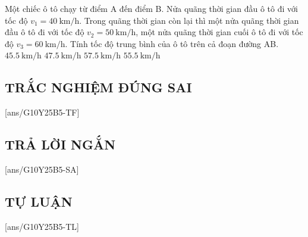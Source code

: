 \begin{ex}
	Một chiếc ô tô chạy từ điểm A đến điểm B. Nửa quãng thời gian đầu ô tô đi với tốc độ $v_1=\SI{40}{\kilo\meter/\hour}$. Trong quãng thời gian còn lại thì một nửa quãng thời gian đầu ô tô đi với tốc độ $v_2=\SI{50}{\kilo\meter/\hour}$, một nửa quãng thời gian cuối ô tô đi với tốc độ $v_3=\SI{60}{\kilo\meter/\hour}$. Tính tốc độ trung bình của ô tô trên cả đoạn đường AB.
	\choice
	{$\SI{45.5}{\kilo\meter/\hour}$}
	{\True $\SI{47.5}{\kilo\meter/\hour}$}
	{$\SI{57.5}{\kilo\meter/\hour}$}
	{$\SI{55.5}{\kilo\meter/\hour}$}
	\loigiai{}
\end{ex}
\subsection{TRẮC NGHIỆM ĐÚNG SAI}
\setcounter{ex}{0}
[ans/G10Y25B5-TF]


\subsection{TRẢ LỜI NGẮN}
\setcounter{ex}{0}
[ans/G10Y25B5-SA]


\subsection{TỰ LUẬN}
\setcounter{ex}{0}
[ans/G10Y25B5-TL]

